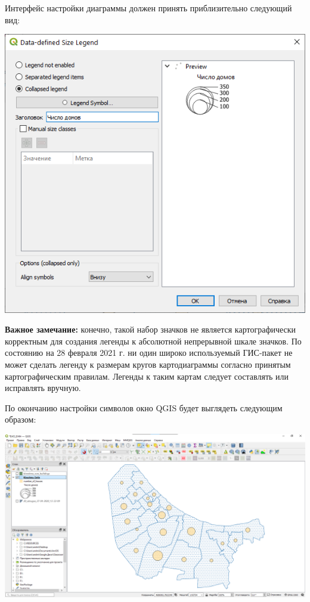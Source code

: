 \documentclass[
  12pt,
]{book}
\begin{document}
Интерфейс настройки диаграммы должен принять приблизительно следующий вид:

\includegraphics{images/Ex05_Vectorization/diagram2.png}

\textbf{Важное замечание:} конечно, такой набор значков не является картографически корректным для создания легенды к абсолютной непрерывной шкале значков. По состоянию на 28 февраля 2021 г. ни один широко используемый ГИС-пакет не может сделать легенду к размерам кругов картодиаграммы согласно принятым картографическим правилам. Легенды к таким картам следует составлять или исправлять вручную.

По окончанию настройки символов окно QGIS будет выглядеть следующим образом:

\includegraphics{images/Ex05_Vectorization/map_diagrams.png}
\end{document}

